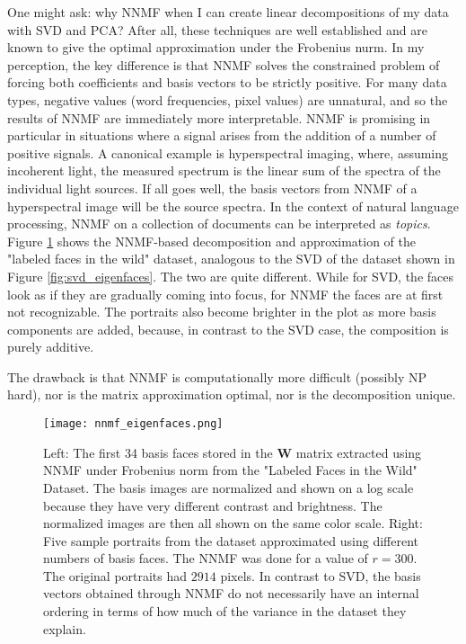 One might ask: why NNMF when I can create linear decompositions of my data with SVD and PCA? After all, these techniques are well established and are known to give the optimal approximation under the Frobenius nurm. In my perception, the key difference is that NNMF solves the constrained problem of forcing both coefficients and basis vectors to be strictly positive. For many data types, negative values (word frequencies, pixel values) are unnatural, and so the results of NNMF are immediately more interpretable. NNMF is promising in particular in situations where a signal arises from the addition of a number of positive signals. A canonical example is hyperspectral imaging, where, assuming incoherent light, the measured spectrum is the linear sum of the spectra of the individual light sources. If all goes well, the basis vectors from NNMF of a hyperspectral image will be the source spectra. In the context of natural language processing, NNMF on a collection of documents can be interpreted as \textit{topics}. Figure \ref{fig:nnmf_eigenfaces} shows the NNMF-based decomposition and approximation of the "labeled faces in the wild" dataset, analogous to the SVD of the dataset shown in Figure \ref{fig:svd_eigenfaces}. The two are quite different. While for SVD, the faces look as if they are gradually coming into focus, for NNMF the faces are at first not recognizable. The portraits also become brighter in the plot as more basis components are added, because, in contrast to the SVD case, the composition is purely additive.  

The drawback is that NNMF is computationally more difficult (possibly NP hard), nor is the matrix approximation optimal, nor is the decomposition unique. 


\begin{figure}
\centering
    \texttt{[image: nnmf\_eigenfaces.png]}
    \caption{Left: The first 34 basis faces stored in the $\mathbf{W}$ matrix extracted using NNMF under Frobenius norm from the "Labeled Faces in the Wild" Dataset. The basis images are normalized and shown on a log scale because they have very different contrast and brightness. The normalized images are then all shown on the same color scale. Right: Five sample portraits from the dataset approximated using different numbers of basis faces. The NNMF was done for a value of $r=300$. The original portraits had $2914$ pixels. In contrast to SVD, the basis vectors obtained through NNMF do not necessarily have an internal ordering in terms of how much of the variance in the dataset they explain.}
    \label{fig:nnmf_eigenfaces}
\end{figure}